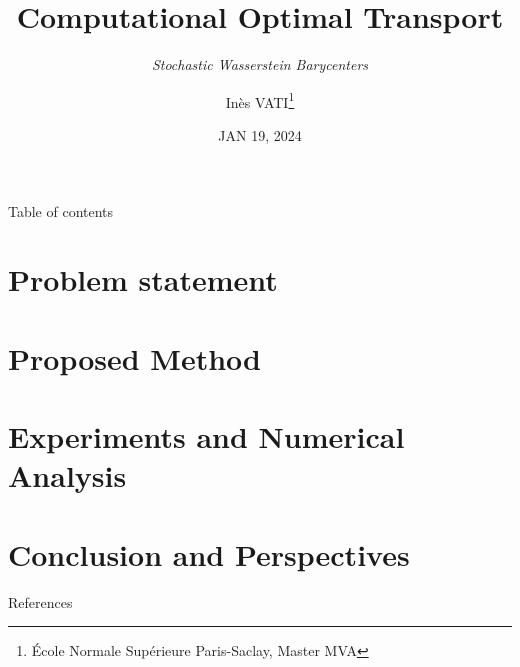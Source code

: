 \documentclass[hyperref={pdftex}]{beamer}
\title{Computational Optimal Transport}
\subtitle{\textit{Stochastic Wasserstein Barycenters}}
\author{Inès VATI\thanks{École Normale Supérieure Paris-Saclay, Master MVA}} %
\institute[MVA]{\texttt{[image: figures/mva logo.png]}}
\date{ JAN 19, 2024 } %
\begin{document}
\begin{frame}[plain]
  \titlepage
\end{frame}    

\begin{frame}{Table of contents}
  \tableofcontents
\end{frame}

\section{Problem statement}


\section{Proposed Method}



\section{Experiments and Numerical Analysis}


\section{Conclusion and Perspectives}


\begin{frame}[allowframebreaks]{References}
    \printbibliography
\end{frame}
\end{document}
